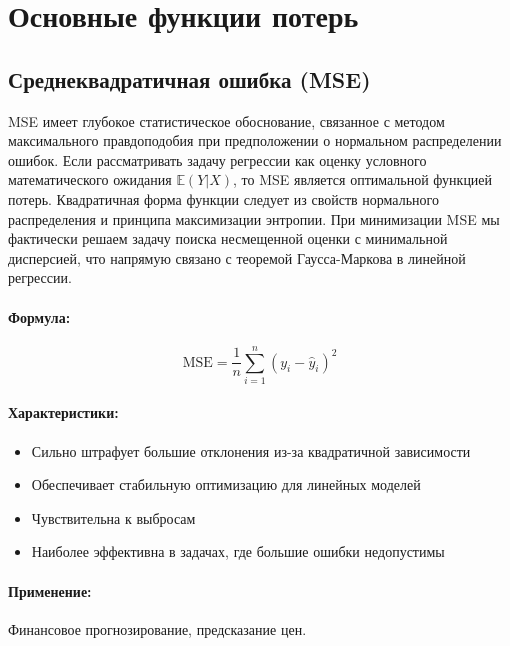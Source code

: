 \section{Основные функции потерь}


\subsection{Среднеквадратичная ошибка (MSE)}

MSE имеет глубокое статистическое обоснование, связанное с методом максимального правдоподобия при предположении о нормальном распределении ошибок. Если рассматривать задачу регрессии как оценку условного математического ожидания $\mathbb{E}(Y|X)$, то MSE является оптимальной функцией потерь. Квадратичная форма функции следует из свойств нормального распределения и принципа максимизации энтропии. При минимизации MSE мы фактически решаем задачу поиска несмещенной оценки с минимальной дисперсией, что напрямую связано с теоремой Гаусса-Маркова в линейной регрессии.

\paragraph{Формула:}
\begin{equation}
    \text{MSE} = \frac{1}{n} \sum_{i=1}^{n} (y_i - \hat{y}_i)^2
\end{equation}

\paragraph{Характеристики:}
\begin{itemize}
    \item Сильно штрафует большие отклонения из-за квадратичной зависимости
    \item Обеспечивает стабильную оптимизацию для линейных моделей
    \item Чувствительна к выбросам
    \item Наиболее эффективна в задачах, где большие ошибки недопустимы
\end{itemize}

\paragraph{Применение:} Финансовое прогнозирование, предсказание цен.

